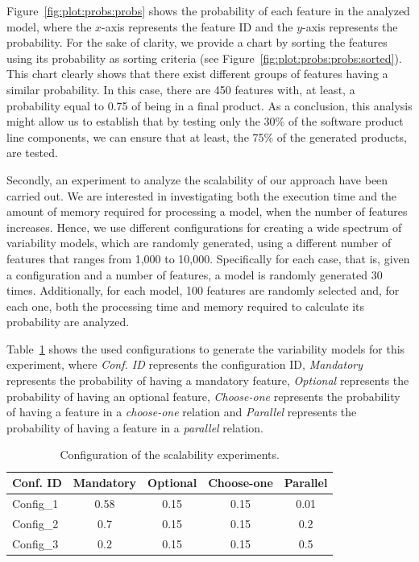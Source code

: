 Figure~\ref{fig:plot:probs:probs} shows the probability of each feature in the analyzed model, where the $x$-axis
represents the feature ID and the $y$-axis represents the probability. For the sake of clarity, we provide a chart by sorting the features using its probability as sorting criteria (see Figure~\ref{fig:plot:probs:probs:sorted}).
This chart clearly shows that there exist different groups of features having a similar probability.
%
In this case, there are 450 features with, at least, a probability equal to 0.75 of being in a final product. As a conclusion,
this analysis might allow us to establish that by testing only the 30\% of the software product line components, we can ensure that
at least, the 75\% of the generated products, are tested.

Secondly, an experiment to analyze the scalability of our approach have been carried out. We are interested in investigating both the execution time and the amount of memory required for processing a model, when the number of features increases. Hence, we use different configurations for creating a wide spectrum of variability models, which are randomly generated, using a different number of features that ranges from 1,000 to 10,000. Specifically for each case, that is, given a configuration and a number of features, a model is randomly generated 30 times. Additionally, for each model, 100 features are 
randomly selected and, for each one, both the processing time and memory required to calculate its probability are analyzed.

Table~\ref{scalaExperiment} shows the used configurations to generate the variability models for this experiment, 
where \textit{Conf. ID} represents the configuration ID, 
 \textit{Mandatory} represents the probability of having a mandatory feature, 
 \textit{Optional} represents the probability of having an optional feature,
 \textit{Choose-one} represents the probability of having a feature in a \textit{choose-one} relation and
 \textit{Parallel} represents the probability of having a feature in a \textit{parallel} relation.

\begin{table}[h]
\centering
\begin{tabular}{|l|c|c|c|c|}
\hline
\textbf{Conf. ID} & \textbf{Mandatory} &  \textbf{Optional} &  \textbf{Choose-one} &  \textbf{Parallel} \\ \hline
	Config\_1		& 0.58	& 0.15	& 0.15	& 0.01 	\\ \hline
	Config\_2		& 0.7		& 0.15 	& 0.15	& 0.2		\\ \hline
	Config\_3		& 0.2		& 0.15 	& 0.15 	& 0.5 	\\ \hline
\end{tabular}
\caption{Configuration of the scalability experiments.}
\label{scalaExperiment}
\end{table}

